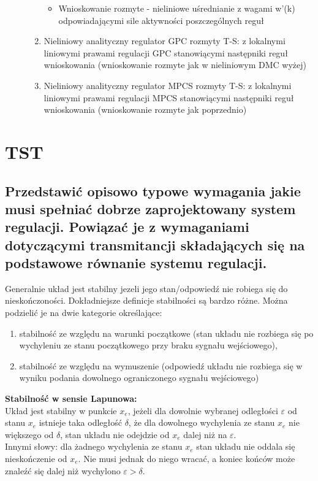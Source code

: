 \begin{description}
\begin{enumerate}
\begin{itemize}
            \item Wnioskowanie rozmyte - nieliniowe uśrednianie z wagami w'(k) odpowiadającymi sile aktywności poszczególnych reguł
        \end{itemize}
        \item Nieliniowy analityczny regulator GPC rozmyty T-S: z lokalnymi liniowymi prawami regulacji GPC stanowiącymi następniki reguł wnioskowania (wnioskowanie rozmyte jak w nieliniowym DMC wyżej)
        \item Nieliniowy analityczny regulator MPCS rozmyty T-S: z lokalnymi liniowymi prawami regulacji MPCS stanowiącymi następniki reguł wnioskowania (wnioskowanie rozmyte jak poprzednio)
    \end{enumerate}
\end{description}

\section{TST}
\subsection{Przedstawić opisowo typowe wymagania jakie musi spełniać dobrze zaprojektowany system regulacji. Powiązać je z wymaganiami dotyczącymi transmitancji składających się na podstawowe równanie systemu regulacji.}
Generalnie układ jest stabilny jezeli jego stan/odpowiedź nie robiega się do nieskończoności. Dokładniejsze definicje stabilności są bardzo różne. Można podzielić je na dwie kategorie określające:
\begin{enumerate}
    \item stabilność ze względu na warunki początkowe (stan układu nie rozbiega się po wychyleniu ze stanu początkowego przy braku sygnału wejściowego),
    \item stabilność ze względu na wymuszenie (odpowiedź układu nie rozbiega się w wyniku podania dowolnego ograniczonego sygnału wejściowego)
\end{enumerate}

\textbf{Stabilność w sensie Lapunowa:}\\
Układ jest stabilny w punkcie $x_e$, jeżeli dla dowolnie wybranej odległości $\varepsilon$ od stanu $x_e$ istnieje taka odległość $\delta$, że dla dowolnego wychylenia ze stanu $x_e$ nie większego od $\delta$, stan układu nie odejdzie od $x_e$ dalej niż na $\varepsilon$.\\
Innymi słowy: dla żadnego wychylenia ze stanu $x_e$ stan układu nie oddala się nieskończenie od $x_e$. Nie musi jednak do niego wracać, a koniec końców może znaleźć się dalej niż wychylono $\varepsilon>\delta$.


